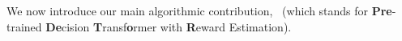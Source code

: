 





We now introduce our main algorithmic contribution, \pred\ (which stands for \textbf{Pre}-trained \textbf{De}cision \textbf{T}ransf\textbf{o}rmer with \textbf{R}eward Estimation). %
%
%
%

